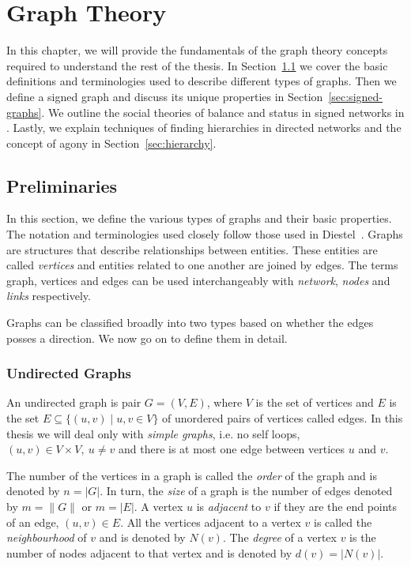 
\chapter{Graph Theory}
\label{chp:graph-theory}
In this chapter, we will provide the fundamentals of the graph theory concepts required to understand the rest of the thesis. In Section~\ref{sec:prelim} we cover the basic definitions and terminologies used to describe different types of graphs. Then we define a signed graph and discuss its unique properties in Section~\ref{sec:signed-graphs}. We outline the social theories of balance and status in signed networks in . Lastly, we explain techniques of finding hierarchies in directed networks and the concept of agony in Section~\ref{sec:hierarchy}.

\section{Preliminaries}
\label{sec:prelim}
In this section, we define the various types of graphs and their basic properties. The notation and terminologies used closely follow those used in Diestel~\cite{diestel1997graph}. Graphs are structures that describe relationships between entities. These entities are called \textit{vertices} and entities related to one another are joined by edges. The terms graph, vertices and edges can be used interchangeably with \textit{network}, \textit{nodes} and \textit{links} respectively.

Graphs can be classified broadly into two types based on whether the edges posses a direction. We now go on to define them in detail.
\subsection{Undirected Graphs}
An undirected graph is pair $G=(V,E)$, where $V$ is the set of vertices and $E$ is the set $E \subseteq \{ (u,v) \mid u,v \in V\}$ of unordered pairs of vertices called edges. In this thesis we will deal only with \textit{simple graphs}, i.e. no self loops, $(u,v)\in V \times V, ~ u\neq v$ and there is at most one edge between vertices $u$ and $v$. 

The number of the vertices in a graph is called the \textit{order} of the graph and is denoted by $n= |G|$. In turn, the \textit{size} of a graph is the number of edges denoted by $m = \|G\|$ or $m=|E|$. A vertex $u$ is \textit{adjacent} to $v$ if they are the end points of an edge, $(u,v) \in E$. All the vertices adjacent to a vertex $v$ is called the \textit{neighbourhood} of $v$ and is denoted by $N(v)$. The \textit{degree} of a vertex $v$ is the number of nodes adjacent to that vertex and is denoted by $d(v) = |N(v)|$. 

